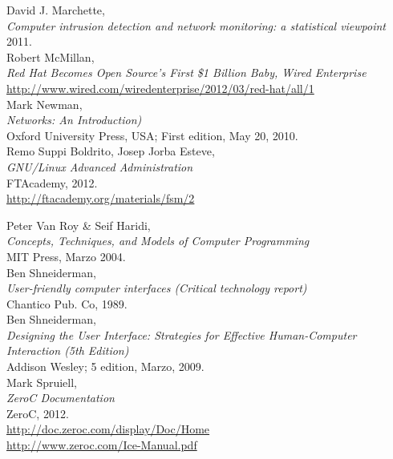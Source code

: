 \begin{thebibliography}{XXX}
     David J. Marchette,\\
    \newblock \emph{Computer intrusion detection and network monitoring: a statistical viewpoint}
    2011.\\
    
	 Robert McMillan,\\ 
	\newblock \emph{Red Hat Becomes Open Source’s First \$1 Billion Baby, Wired
	Enterprise}\\
    \url{http://www.wired.com/wiredenterprise/2012/03/red-hat/all/1}\\ 

     Mark Newman,\\
    \newblock \emph{Networks: An Introduction)}\\
    Oxford University Press, USA; First edition, May 20, 2010.\\

     Remo Suppi Boldrito, Josep Jorba Esteve,\\
    \newblock \emph{GNU/Linux Advanced Administration}\\
    FTAcademy, 2012.\\
    \url{http://ftacademy.org/materials/fsm/2}

     Peter Van Roy \& Seif Haridi,\\
    \newblock \emph{Concepts, Techniques, and Models of Computer Programming}\\
    MIT Press, Marzo 2004.\\
    
     Ben Shneiderman,\\
    \newblock \emph{User-friendly computer interfaces (Critical technology report)}\\
    Chantico Pub. Co, 1989.\\
    
     Ben Shneiderman,\\
    \newblock \emph{Designing the User Interface: Strategies for Effective Human-Computer Interaction (5th Edition)}\\
    Addison Wesley; 5 edition, Marzo, 2009.\\
    
     Mark Spruiell,\\
    \newblock \emph{ZeroC Documentation}\\
    ZeroC, 2012.\\ 
    \url{http://doc.zeroc.com/display/Doc/Home}\\
    \url{http://www.zeroc.com/Ice-Manual.pdf}\\
        

\end{thebibliography}
